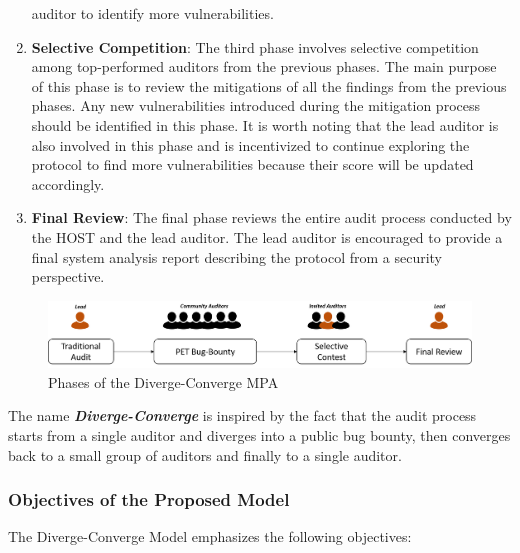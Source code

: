 \documentclass[10pt]{extarticle}
\begin{document}
\begin{enumerate}
  auditor to identify more vulnerabilities.
\item
  \textbf{Selective Competition}: The third phase involves selective
  competition among top-performed auditors from the previous phases. The
  main purpose of this phase is to review the mitigations of all the
  findings from the previous phases. Any new vulnerabilities introduced
  during the mitigation process should be identified in this phase. It
  is worth noting that the lead auditor is also involved in this phase
  and is incentivized to continue exploring the protocol to find more
  vulnerabilities because their score will be updated accordingly.
\item
  \textbf{Final Review}: The final phase reviews the entire audit
  process conducted by the HOST and the lead auditor. The lead auditor
  is encouraged to provide a final system analysis report describing the
  protocol from a security perspective.
\end{enumerate}

\begin{figure}[htp]
  \centering
  \includegraphics[width=12cm]{img/phases}
  \caption{Phases of the Diverge-Converge MPA}
  \label{fig:galaxy}
\end{figure}

The name \emph{\textbf{Diverge-Converge}} is inspired by the fact that
the audit process starts from a single auditor and diverges into a
public bug bounty, then converges back to a small group of auditors and
finally to a single auditor.

\subsubsection{ Objectives of the Proposed
Model}\label{412-objectives-of-the-proposed-model}

The Diverge-Converge Model emphasizes the following objectives:
\end{document}
